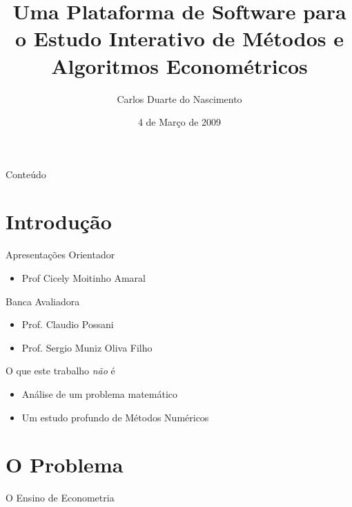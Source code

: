 \documentclass{beamer}
\title[Plataforma para Estudo Interativo de Métodos Econométricos] %
{Uma Plataforma de Software para o Estudo Interativo de Métodos e Algoritmos Econométricos}
\author %
{Carlos Duarte do Nascimento}
\institute[Universidade de São Paulo] %
{
  Instituto de Matemática e Estatística\\
  Universidade de São Paulo
}
\date %
{4 de Março de 2009}
\begin{document}
\begin{frame}
  \titlepage
\end{frame}

\begin{frame}{Conteúdo}
  \tableofcontents
\end{frame}




\section{Introdução}
\begin{frame}{Apresentações}
	Orientador	
			\begin{itemize}
				\item{Prof Cicely Moitinho Amaral}
			\end{itemize}			
	Banca Avaliadora
			\begin{itemize}
				\item{Prof. Claudio Possani}
				\item{Prof. Sergio Muniz Oliva Filho}
	\end{itemize}
\end{frame}

\begin{frame}{O que este trabalho \textit{não} é}
	\begin{itemize}
		\item Análise de um problema matemático
		\item Um estudo profundo de Métodos Numéricos
	\end{itemize}
\end{frame}

\section{O Problema}

\begin{frame}{O Ensino de Econometria}
\end{frame}
\end{document}
